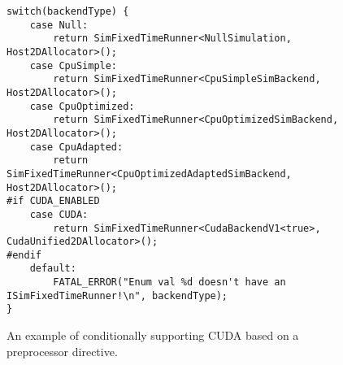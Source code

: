 \begin{figure}[ht]
    \centering
    \lstset{
 language=c++
}
\lstset{linewidth=1.15\linewidth,xleftmargin=-.075\linewidth}
\begin{lstlisting}
switch(backendType) {
    case Null:
        return SimFixedTimeRunner<NullSimulation, Host2DAllocator>();
    case CpuSimple:
        return SimFixedTimeRunner<CpuSimpleSimBackend, Host2DAllocator>();
    case CpuOptimized:
        return SimFixedTimeRunner<CpuOptimizedSimBackend, Host2DAllocator>();
    case CpuAdapted:
        return SimFixedTimeRunner<CpuOptimizedAdaptedSimBackend, Host2DAllocator>();
#if CUDA_ENABLED
    case CUDA:
        return SimFixedTimeRunner<CudaBackendV1<true>, CudaUnified2DAllocator>();
#endif
    default:
        FATAL_ERROR("Enum val %d doesn't have an ISimFixedTimeRunner!\n", backendType);
}\end{lstlisting}
    \caption{An example of conditionally supporting CUDA based on a preprocessor directive.}
    \label{fig:ConditionalCUDA}
\end{figure}